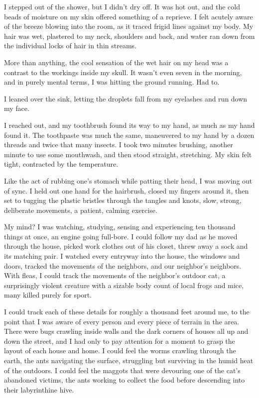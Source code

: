 





I stepped out of the shower, but I didn't dry off.  It was hot out, and the cold beads of moisture on my skin offered something of a reprieve.  I felt acutely aware of the breeze blowing into the room, as it traced frigid lines against my body.  My hair was wet, plastered to my neck, shoulders and back, and water ran down from the individual locks of hair in thin streams.



More than anything, the cool sensation of the wet hair on my head was a contrast to the workings inside my skull.  It wasn't even seven in the morning, and in purely mental terms, I was hitting the ground running.  Had to.



I leaned over the sink, letting the droplets fall from my eyelashes and run down my face.



I reached out, and my toothbrush found its way to my hand, as much as my hand found it.  The toothpaste was much the same, maneuvered to my hand by a dozen threads and twice that many insects.  I took two minutes brushing, another minute to use some mouthwash, and then stood straight, stretching.  My skin felt tight, contracted by the temperature.



Like the act of rubbing one's stomach while patting their head, I was moving out of sync.  I held out one hand for the hairbrush, closed my fingers around it, then set to tugging the plastic bristles through the tangles and knots, slow, strong, deliberate movements, a patient, calming exercise.



My mind?  I was watching, studying, sensing and experiencing ten thousand things at once, an engine going full-bore.  I could follow my dad as he moved through the house, picked work clothes out of his closet, threw away a sock and its matching pair.  I watched every entryway into the house, the windows and doors, tracked the movements of the neighbors, and our neighbor's neighbors.  With fleas, I could track the movements of the neighbor's outdoor cat, a surprisingly violent creature with a sizable body count of local frogs and mice, many killed purely for sport.



I could track each of these details for roughly a thousand feet around me, to the point that I was aware of every person and every piece of terrain in the area.  There were bugs crawling inside walls and the dark corners of houses all up and down the street, and I had only to pay attention for a moment to grasp the layout of each house and home.  I could feel the worms crawling through the earth, the ants navigating the surface, struggling but surviving in the humid heat of the outdoors.  I could feel the maggots that were devouring one of the cat's abandoned victims, the ants working to collect the food before descending into their labyrinthine hive.



